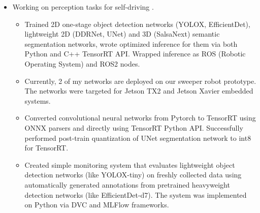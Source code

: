 \documentclass[10pt,a4paper]{altacv}
\newcommand{\MYhref}[3][Navy]{\href{#2}{\color{#1}{#3}}}%
\begin{document}
\begin{itemize}
\item Working on perception tasks for self-driving \MYhref{https://www.youtube.com/watch?v=nBZdgo9uvz4}{sweeper robot}.
\begin{itemize}
    \item Trained 2D one-stage object detection networks (YOLOX, EfficientDet), lightweight 2D (DDRNet, UNet) and 3D (SalsaNext) semantic segmentation networks, wrote optimized inference for them via both Python and C++ TensorRT API. Wrapped inference as ROS (Robotic Operating System) and ROS2 nodes.
    \item Currently, 2 of my networks are deployed on our sweeper robot prototype. The networks were targeted for Jetson TX2 and Jetson Xavier embedded systems. 
    \item Converted convolutional neural networks from Pytorch to TensorRT using ONNX parsers and directly using TensorRT Python API. Successfully performed post-train quantization of UNet segmentation network to int8 for TensorRT.
    \item Created simple monitoring system that evaluates lightweight object detection networks (like YOLOX-tiny) on freshly collected data using automatically generated annotations from pretrained heavyweight detection networks (like EfficientDet-d7). The system was implemented on Python via DVC and MLFlow frameworks.  
    
\end{itemize}

\end{itemize}

\divider

\end{document}
